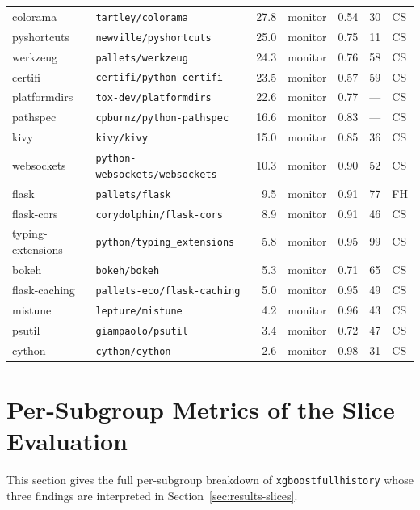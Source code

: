 \begin{table}[htbp]
\begin{tabular}{llrlrrl}
    colorama & \texttt{tartley/colorama} & 27.8 & monitor & 0.54 & 30 & CS \\
    pyshortcuts & \texttt{newville/pyshortcuts} & 25.0 & monitor & 0.75 & 11 & CS \\
    werkzeug & \texttt{pallets/werkzeug} & 24.3 & monitor & 0.76 & 58 & CS \\
    certifi & \texttt{certifi/python-certifi} & 23.5 & monitor & 0.57 & 59 & CS \\
    platformdirs & \texttt{tox-dev/platformdirs} & 22.6 & monitor & 0.77 & --- & CS \\
    pathspec & \texttt{cpburnz/python-pathspec} & 16.6 & monitor & 0.83 & --- & CS \\
    kivy & \texttt{kivy/kivy} & 15.0 & monitor & 0.85 & 36 & CS \\
    websockets & \texttt{python-websockets/websockets} & 10.3 & monitor & 0.90 & 52 & CS \\
    flask & \texttt{pallets/flask} & 9.5 & monitor & 0.91 & 77 & FH \\
    flask-cors & \texttt{corydolphin/flask-cors} & 8.9 & monitor & 0.91 & 46 & CS \\
    typing-extensions & \texttt{python/typing\_extensions} & 5.8 & monitor & 0.95 & 99 & CS \\
    bokeh & \texttt{bokeh/bokeh} & 5.3 & monitor & 0.71 & 65 & CS \\
    flask-caching & \texttt{pallets-eco/flask-caching} & 5.0 & monitor & 0.95 & 49 & CS \\
    mistune & \texttt{lepture/mistune} & 4.2 & monitor & 0.96 & 43 & CS \\
    psutil & \texttt{giampaolo/psutil} & 3.4 & monitor & 0.72 & 47 & CS \\
    cython & \texttt{cython/cython} & 2.6 & monitor & 0.98 & 31 & CS \\
    \bottomrule
  \end{tabular}
\end{table}

\clearpage
\section{Per-Subgroup Metrics of the Slice Evaluation}
\label{appendix:eval-tables}

This section gives the full per-subgroup breakdown of \texttt{xgboost\sdash full\sdash history} whose three findings are interpreted in Section~\ref{sec:results-slices}.


